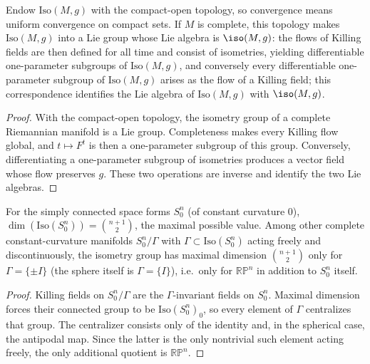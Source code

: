 \begin{lemma}
  \label{lem:pet-ch8-killing-flow-oneparameter-subgroup}
  Endow $\mathrm{Iso}(M,g)$ with the compact-open topology, so convergence means
  uniform convergence on compact sets. If $M$ is complete, this topology makes
  $\mathrm{Iso}(M,g)$ into a Lie group whose Lie algebra is $\iso(M,g)$: the
  flows of Killing fields are then defined for all time and consist of
  isometries, yielding differentiable one-parameter subgroups of
  $\mathrm{Iso}(M,g)$, and conversely every differentiable one-parameter
  subgroup of $\mathrm{Iso}(M,g)$ arises as the flow of a Killing field; this
  correspondence identifies the Lie algebra of $\mathrm{Iso}(M,g)$ with
  $\iso(M,g)$.
\end{lemma}
\begin{proof}
  \sketch
  With the compact-open topology, the isometry group of a complete Riemannian
  manifold is a Lie group. Completeness makes every Killing flow global, and
  \(t\mapsto F^t\) is then a one-parameter subgroup of this group. Conversely,
  differentiating a one-parameter subgroup of isometries produces a vector
  field whose flow preserves \(g\). These two operations are inverse and
  identify the two Lie algebras.
\end{proof}

\begin{remark}
  \label{rem:pet-ch8-max-isometry-space-forms}
  For the simply connected space forms $S^n_0$ (of constant curvature $0$),
  $\dim(\mathrm{Iso}(S^n_0))=\binom{n+1}2$, the maximal possible value. Among
  other complete constant-curvature manifolds $S^n_0/\Gamma$ with
  $\Gamma\subset\mathrm{Iso}(S^n_0)$ acting freely and discontinuously, the
  isometry group has maximal dimension $\binom{n+1}2$ only for
  $\Gamma=\{\pm I\}$ (the sphere itself is $\Gamma=\{I\}$), i.e.\ only for
  $\mathbb{RP}^n$ in addition to $S^n_0$ itself.
\end{remark}
\begin{proof}
  \sketch
  Killing fields on \(S^n_0/\Gamma\) are the \(\Gamma\)-invariant fields on
  \(S^n_0\). Maximal dimension forces their connected group to be
  \(\mathrm{Iso}(S^n_0)_0\), so every element of \(\Gamma\) centralizes that
  group. The centralizer consists only of the identity and, in the spherical
  case, the antipodal map. Since the latter is the only nontrivial such element
  acting freely, the only additional quotient is \(\mathbb{RP}^n\).
\end{proof}

